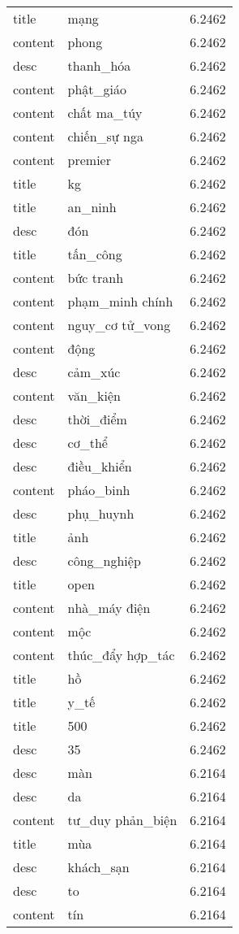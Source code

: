 \documentclass{article}
\begin{document}
\begin{tabular}{lll}
title & mạng & 6.2462\\
content & phong & 6.2462\\
desc & thanh\_hóa & 6.2462\\
content & phật\_giáo & 6.2462\\
content & chất ma\_túy & 6.2462\\
content & chiến\_sự nga & 6.2462\\
content & premier & 6.2462\\
title & kg & 6.2462\\
title & an\_ninh & 6.2462\\
desc & đón & 6.2462\\
title & tấn\_công & 6.2462\\
content & bức tranh & 6.2462\\
content & phạm\_minh chính & 6.2462\\
content & nguy\_cơ tử\_vong & 6.2462\\
content & động & 6.2462\\
desc & cảm\_xúc & 6.2462\\
content & văn\_kiện & 6.2462\\
desc & thời\_điểm & 6.2462\\
desc & cơ\_thể & 6.2462\\
desc & điều\_khiển & 6.2462\\
content & pháo\_binh & 6.2462\\
desc & phụ\_huynh & 6.2462\\
title & ảnh & 6.2462\\
desc & công\_nghiệp & 6.2462\\
title & open & 6.2462\\
content & nhà\_máy điện & 6.2462\\
content & mộc & 6.2462\\
content & thúc\_đẩy hợp\_tác & 6.2462\\
title & hồ & 6.2462\\
title & y\_tế & 6.2462\\
title & 500 & 6.2462\\
desc & 35 & 6.2462\\
desc & màn & 6.2164\\
desc & da & 6.2164\\
content & tư\_duy phản\_biện & 6.2164\\
title & mùa & 6.2164\\
desc & khách\_sạn & 6.2164\\
desc & to & 6.2164\\
content & tín & 6.2164\\

\end{tabular}
\end{document}
